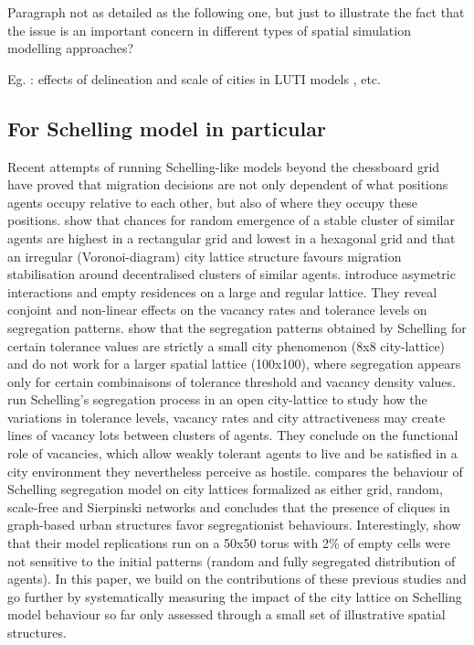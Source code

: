 \documentclass[11pt]{article}
\begin{document}
Paragraph not as detailed as the following one, but just to illustrate the fact that the issue is an important concern in different types of spatial simulation modelling approaches?

Eg. : effects of delineation and scale of cities in LUTI models \citep{Thomasetal2017}, etc.

\subsection{For Schelling model in particular}

Recent attempts of running Schelling-like models beyond the chessboard grid have proved that migration decisions are not only dependent of what positions agents occupy relative to each other, but also of where they occupy these positions. \citet{FlacheHegselmann2001} show that chances for random emergence of a stable cluster of similar agents are highest in a rectangular grid and lowest in a hexagonal grid and that an irregular (Voronoi-diagram) city lattice structure favours migration stabilisation around decentralised clusters of similar agents. \citet{StaufferSolomon2007} introduce asymetric interactions and empty residences on a large and regular lattice. They reveal conjoint and non-linear effects on the vacancy rates and tolerance levels on segregation patterns. \citet{Singhetal2009} show that the segregation patterns obtained by Schelling for certain tolerance values are strictly a small city phenomenon (8x8 city-lattice) and do not work for a larger spatial lattice (100x100), where segregation appears only for certain combinaisons of tolerance threshold and vacancy density values. \citet{Gauvinetal2010} run Schelling's segregation process in an open city-lattice to study how the variations in tolerance levels, vacancy rates and city attractiveness may create lines of vacancy lots between clusters of agents. They conclude on the functional role of vacancies, which allow weakly tolerant agents to live and be satisfied in a city environment they nevertheless perceive as hostile. 
\citet{Banos2012} compares the behaviour of Schelling segregation model on city lattices formalized as either grid, random, scale-free and Sierpinski networks and concludes that the presence of cliques in graph-based urban structures favor segregationist behaviours. Interestingly, \citet{HatnaBenenson2012} show that their model replications run on a 50x50 torus with 2\% of empty cells were not sensitive to the initial patterns (random and fully segregated distribution of agents). In this paper, we build on the contributions of these previous studies and go further by systematically measuring the impact of the city lattice on Schelling model behaviour so far only assessed through a small set of illustrative spatial structures. 
\end{document}
